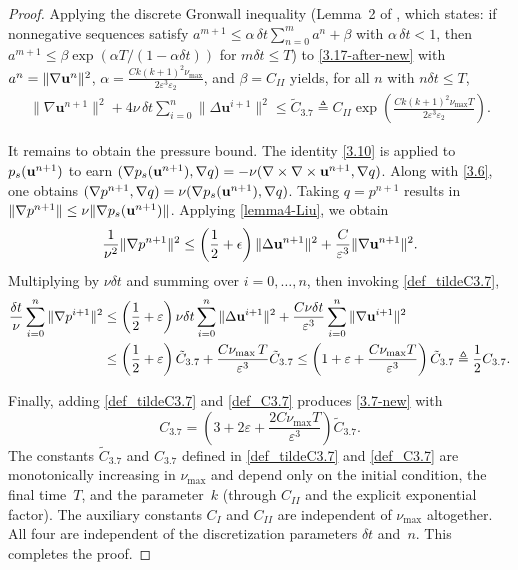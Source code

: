 \documentclass{article}
\theoremstyle{definition}                   %
\begin{document}
\begin{proof}
Applying the discrete Gronwall inequality (Lemma~2 of \cite{HuangShen2023},
which states: if nonnegative sequences satisfy
$a^{m+1}\le \alpha\,\delta t\sum_{n=0}^{m}a^n+\beta$ with
$\alpha\,\delta t<1$, then $a^{m+1}\le\beta\exp(\alpha T/(1-\alpha\delta t))$
for $m\delta t\le T$) to \eqref{3.17-after-new} with
$a^n=\|\nabla{\bf u}^n\|^2$,
$\alpha=\frac{Ck(k+1)^2\nu_{\max}}{2\varepsilon^3\varepsilon_2}$, and
$\beta=C_{II}$ yields, for all $n$ with $n\delta t\le T$,
\begin{align}
  \|\nabla\mathbf{u}^{n+1}\|^2
  + 4 \nu\,\delta t\sum_{i=0}^n\|\Delta\mathbf{u}^{i+1}\|^2
  \le  \tilde{C}_{3.7}
  \triangleq C_{II} \exp\left(
\frac{Ck(k+1)^2\nu_{\max} T}{2\varepsilon^3\varepsilon_2 }
 \right).
\label{def_tildeC3.7}
\end{align}

It remains to obtain the pressure bound. 
The identity \eqref{3.10} is applied to $p_s({\bf u}^{n+1})$ to earn  
$(\nabla p_s({\bf u}^{n+1}), \nabla q) = -\nu (\nabla\times \nabla\times {\bf u}^{n+1}, \nabla q)$.
Along with \eqref{3.6}, one obtains $(\nabla p^{n+1},\nabla q)=\nu (\nabla p_s({\bf u}^{n+1}), \nabla q)$. Taking $q=p^{n+1}$ results in 
$\| \nabla p^{n+1} \| \le \nu \| \nabla p_s({\bf u}^{n+1})\|$. 
Applying \eqref{lemma4-Liu}, we obtain 
$$
\frac{1}{\nu^2} \| \nabla p^{n+1}\|^2 \le \left(\frac{1}{2}+\epsilon\right) \| \Delta {\bf u}^{n+1} \|^2 
+ \frac{C}{\varepsilon^3} \|\nabla {\bf u}^{n+1} \|^2.
$$
%
Multiplying by $\nu\delta t$ and summing over $i=0,\dots,n$, then invoking
\eqref{def_tildeC3.7},
\begin{align}
\frac{\delta t}{\nu} \sum_{i=0}^n \|\nabla p^{i+1} \|^2
& \le \left(\frac{1}{2}+\varepsilon\right) \nu \delta t \sum_{i=0}^n
\| \Delta {\bf u}^{i+1} \|^2
+ \frac{C \nu \delta t}{\varepsilon^3} \sum_{i=0}^n \| \nabla {\bf u}^{i+1} \|^2 \notag\\
&\le  \left(\frac{1}{2}+\varepsilon\right) \tilde{C}_{3.7} + \frac{C\nu_{\max}\, T}{\varepsilon^3} \tilde{C}_{3.7}
\le \left(1 +\varepsilon  + \frac{C\nu_{\max} T}{\varepsilon^3} \right) \tilde{C}_{3.7}
\triangleq \frac{1}{2} C_{3.7}.
\label{def_C3.7}
\end{align}

Finally, adding \eqref{def_tildeC3.7} and \eqref{def_C3.7} produces
\eqref{3.7-new} with
\[
C_{3.7}=\left( 3+ 2\varepsilon+ \frac{2C\nu_{\max} T}{\varepsilon^3}\right) \tilde{C}_{3.7}.
\]
The constants $\tilde C_{3.7}$ and $C_{3.7}$ defined in
\eqref{def_tildeC3.7} and \eqref{def_C3.7} are monotonically increasing in
$\nu_{\max}$ and depend only on the initial condition, the final time~$T$,
and the parameter~$k$ (through $C_{II}$ and the explicit exponential factor).
The auxiliary constants $C_I$ and $C_{II}$ are independent of $\nu_{\max}$
altogether. All four are independent of the discretization parameters
$\delta t$ and~$n$. This completes the proof.
\end{proof}
\end{document}
